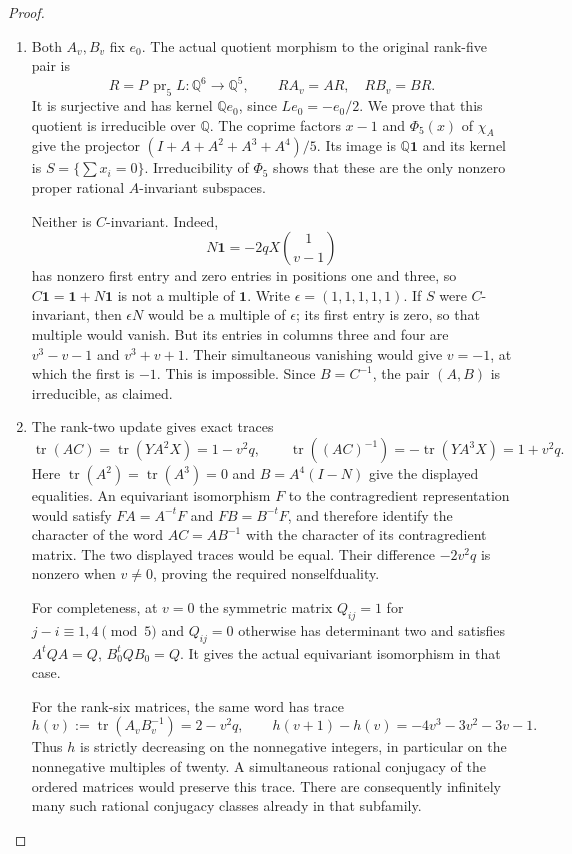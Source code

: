 \documentclass[11pt,a4paper]{article}
\theoremstyle{definition}
\begin{document}
\begin{proof}
\begin{enumerate}[label=\arabic*.]
\item Both $A_v,B_v$ fix $e_0$. The actual quotient morphism to
the original rank-five pair is
\[
 R=P\,\operatorname{pr}_5 L:\mathbb Q^6\longrightarrow\mathbb Q^5,
 \qquad RA_v=AR,\quad RB_v=BR.
\]
It is surjective and has kernel $\mathbb Qe_0$, since
$Le_0=-e_0/2$. We prove that this quotient is irreducible over
$\mathbb Q$. The coprime factors $x-1$ and $\Phi_5(x)$ of
$\chi_A$ give the projector
$(I+A+A^2+A^3+A^4)/5$. Its image is $\mathbb Q\mathbf1$ and
its kernel is $S=\{\sum x_i=0\}$. Irreducibility of $\Phi_5$
shows that these are the only nonzero proper rational
$A$-invariant subspaces.

Neither is $C$-invariant. Indeed,
\[
 N\mathbf1=-2qX\binom{1}{v-1}
\]
has nonzero first entry and zero entries in positions one and three,
so $C\mathbf1=\mathbf1+N\mathbf1$ is not a multiple of
$\mathbf1$. Write $\epsilon=(1,1,1,1,1)$. If $S$ were
$C$-invariant, then $\epsilon N$ would be a multiple of
$\epsilon$; its first entry is zero, so that multiple would
vanish. But its entries in columns three and four are
$v^3-v-1$ and $v^3+v+1$. Their simultaneous vanishing would
give $v=-1$, at which the first is $-1$. This is impossible.
Since $B=C^{-1}$, the pair $(A,B)$ is irreducible, as claimed.

\item The rank-two update gives exact traces
\[
 \operatorname{tr}(AC)=\operatorname{tr}(YA^2X)=1-v^2q,
 \qquad
 \operatorname{tr}((AC)^{-1})
       =-\operatorname{tr}(YA^3X)=1+v^2q.
\]
Here $\operatorname{tr}(A^2)=\operatorname{tr}(A^3)=0$ and
$B=A^4(I-N)$ give the displayed equalities. An equivariant
isomorphism $F$ to the contragredient representation would
satisfy $FA=A^{-t}F$ and $FB=B^{-t}F$, and therefore identify
the character of the word $AC=AB^{-1}$ with the character
of its contragredient matrix. The two displayed traces would
be equal. Their difference $-2v^2q$ is nonzero when $v\ne0$,
proving the required nonselfduality.

For completeness, at $v=0$ the symmetric matrix
$Q_{ij}=1$ for $j-i\equiv1,4\pmod5$ and $Q_{ij}=0$ otherwise
has determinant two and satisfies $A^tQA=Q$, $B_0^tQB_0=Q$.
It gives the actual equivariant isomorphism in that case.

For the rank-six matrices, the same word has trace
\[
 h(v):=\operatorname{tr}(A_vB_v^{-1})=2-v^2q,
 \qquad h(v+1)-h(v)=-4v^3-3v^2-3v-1.
\]
Thus $h$ is strictly decreasing on the nonnegative integers,
in particular on the nonnegative multiples of twenty.
A simultaneous rational conjugacy of the ordered matrices
would preserve this trace. There are consequently infinitely
many such rational conjugacy classes already in that subfamily.


\end{enumerate}
\end{proof}
\end{document}
